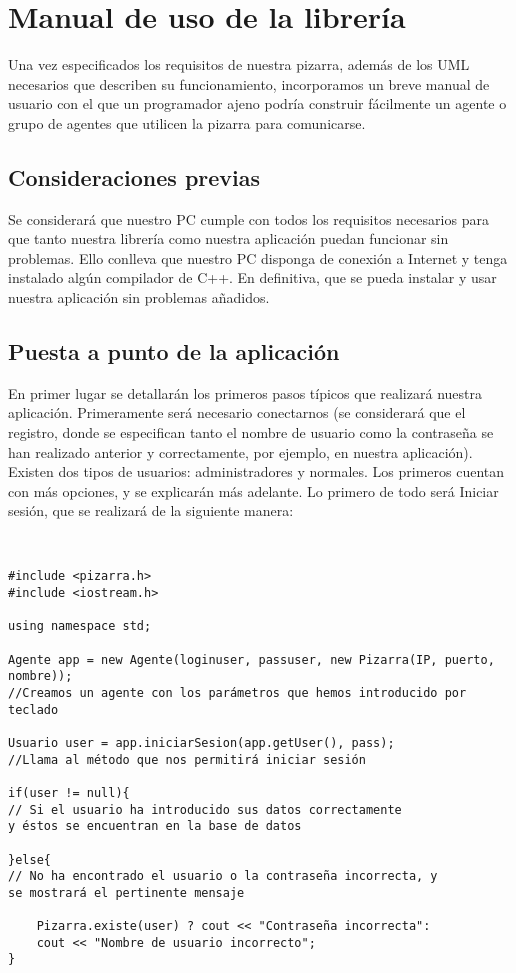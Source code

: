 \chapter{Manual de uso de la librería}
Una vez especificados los requisitos de nuestra pizarra, además de los UML necesarios que describen su funcionamiento, incorporamos un breve manual de usuario con el que un programador ajeno podría construir fácilmente un agente o grupo de agentes que utilicen la pizarra para comunicarse.
\section{Consideraciones previas}
Se considerará que nuestro PC cumple con todos los requisitos necesarios para que tanto nuestra librería como nuestra aplicación puedan funcionar sin problemas. Ello conlleva que nuestro PC disponga de conexión a Internet y tenga instalado algún compilador de C++. En definitiva, que se pueda instalar y usar nuestra aplicación sin problemas añadidos.

\section{Puesta a punto de la aplicación} \label{sec:puesta}
En primer lugar se detallarán los primeros pasos típicos que realizará nuestra aplicación. Primeramente será necesario conectarnos (se considerará que el registro, donde se especifican tanto el nombre de usuario como la contraseña se han realizado anterior y correctamente, por ejemplo, en nuestra aplicación).\\

Existen dos tipos de usuarios: administradores y normales. Los primeros cuentan con más opciones, y se explicarán más adelante. Lo primero de todo será Iniciar sesión, que se realizará de la siguiente manera:
\begin{verbatim}


#include <pizarra.h>
#include <iostream.h>

using namespace std;

Agente app = new Agente(loginuser, passuser, new Pizarra(IP, puerto, nombre)); 
//Creamos un agente con los parámetros que hemos introducido por teclado

Usuario user = app.iniciarSesion(app.getUser(), pass); 
//Llama al método que nos permitirá iniciar sesión

if(user != null){ 
// Si el usuario ha introducido sus datos correctamente 
y éstos se encuentran en la base de datos

}else{            
// No ha encontrado el usuario o la contraseña incorrecta, y 
se mostrará el pertinente mensaje 

    Pizarra.existe(user) ? cout << "Contraseña incorrecta":
    cout << "Nombre de usuario incorrecto";
}
\end{verbatim}


